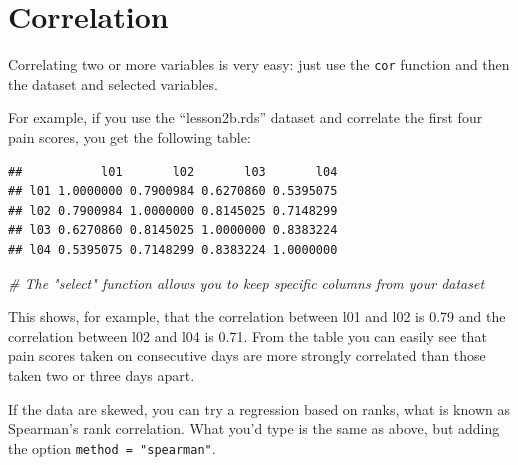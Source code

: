 \documentclass[]{book}
\newenvironment{Shaded}{\begin{snugshade}}{\end{snugshade}}
\newcommand{\CommentTok}[1]{\textcolor[rgb]{0.56,0.35,0.01}{\textit{#1}}}
\newcommand{\DataTypeTok}[1]{\textcolor[rgb]{0.13,0.29,0.53}{#1}}
\newcommand{\KeywordTok}[1]{\textcolor[rgb]{0.13,0.29,0.53}{\textbf{#1}}}
\newcommand{\NormalTok}[1]{#1}
\newcommand{\OperatorTok}[1]{\textcolor[rgb]{0.81,0.36,0.00}{\textbf{#1}}}
\newcommand{\StringTok}[1]{\textcolor[rgb]{0.31,0.60,0.02}{#1}}
\begin{document}
\hypertarget{correlation}{%
\section{Correlation}\label{correlation}}

Correlating two or more variables is very easy: just use the
\texttt{cor} function and then the dataset and selected variables.

For example, if you use the ``lesson2b.rds'' dataset and correlate the
first four pain scores, you get the following table:

\begin{Shaded}
\end{Shaded}

\begin{verbatim}
##           l01       l02       l03       l04
## l01 1.0000000 0.7900984 0.6270860 0.5395075
## l02 0.7900984 1.0000000 0.8145025 0.7148299
## l03 0.6270860 0.8145025 1.0000000 0.8383224
## l04 0.5395075 0.7148299 0.8383224 1.0000000
\end{verbatim}

\begin{Shaded}
\begin{Highlighting}[]
\CommentTok{# The "select" function allows you to keep specific columns from your dataset}
\end{Highlighting}
\end{Shaded}

This shows, for example, that the correlation between l01 and l02 is
0.79 and the correlation between l02 and l04 is 0.71. From the table you
can easily see that pain scores taken on consecutive days are more
strongly correlated than those taken two or three days apart.

If the data are skewed, you can try a regression based on ranks, what is
known as Spearman's rank correlation. What you'd type is the same as
above, but adding the option \texttt{method\ =\ "spearman"}.

\begin{Shaded}
\end{Shaded}
\end{document}
